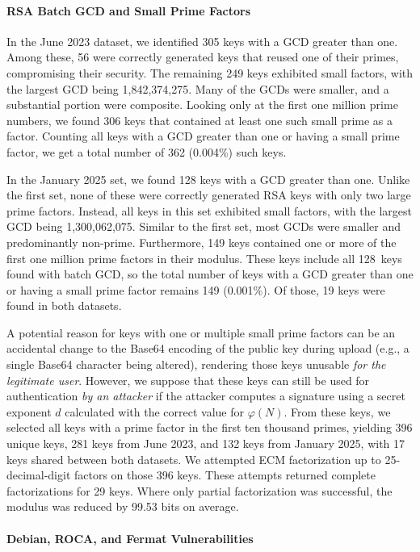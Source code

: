 \paragraph{RSA Batch GCD and Small Prime Factors}

In the June 2023 dataset, we identified 305 keys with a GCD greater than one. Among these, 56 were correctly generated keys that reused one of their primes, compromising their security. The remaining 249 keys exhibited small factors, with the largest GCD being 1,842,374,275. Many of the GCDs were smaller, and a substantial portion were composite. Looking only at the first one million prime numbers, we found 306 keys that contained at least one such small prime as a factor. Counting all keys with a GCD greater than one or having a small prime factor, we get a total number of 362 (0.004\%) such keys.

In the January 2025 set, we found 128 keys with a GCD greater than one. Unlike the first set, none of these were correctly generated RSA keys with only two large prime factors. Instead, all keys in this set exhibited small factors, with the largest GCD being 1,300,062,075. Similar to the first set, most GCDs were smaller and predominantly non-prime. Furthermore, 149 keys contained one or more of the first one million prime factors in their modulus. These keys include all 128~keys found with batch GCD, so the total number of keys with a GCD greater than one or having a small prime factor remains 149 (0.001\%).
Of those, 19 keys were found in both datasets.

A potential reason for keys with one or multiple small prime factors can be an accidental change to the Base64 encoding of the public key during upload (e.g., a single Base64 character being altered), rendering those keys unusable \emph{for the legitimate user}. However, we suppose that these keys can still be used for authentication \emph{by an attacker} if the attacker computes a signature using a secret exponent $d$ calculated with the correct value for $\varphi(N)$. From these keys, we selected all keys with a prime factor in the first ten thousand primes, yielding 396 unique keys, 281 keys from June 2023, and 132 keys from January 2025, with 17 keys shared between both datasets. We attempted ECM factorization up to 25-decimal-digit factors on those 396 keys. These attempts returned complete factorizations for 29 keys. Where only partial factorization was successful, the modulus was reduced by 99.53 bits on average.

\paragraph{Debian, ROCA, and Fermat Vulnerabilities}

